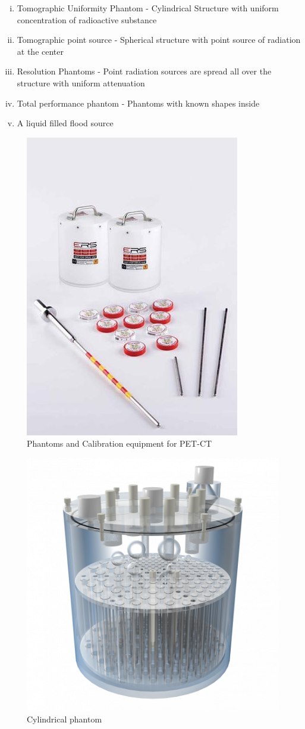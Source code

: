 \documentclass[12pt]{article}
\begin{document}
\begin{enumerate}[i.]
    \item Tomographic Uniformity Phantom - Cylindrical Structure with uniform concentration of radioactive substance
    \item Tomographic point source - Spherical structure with point source of radiation at the center
    \item Resolution Phantoms - Point radiation sources are spread all over the structure with uniform attenuation
    \item Total performance phantom - Phantoms with known shapes inside 
    \item A liquid filled flood source
    
\end{enumerate}

\begin{figure}[h!]
    \centering
    \includegraphics[width=0.45\linewidth]{phantom.jpg}
    \caption{\small{Phantoms and Calibration equipment for PET-CT}}
    \label{fig:Phantoms and Calibration equipment for PET-CT}
\end{figure}
\pagebreak
\begin{figure}[h!]
    \centering
    \includegraphics[width=0.55\linewidth]{phantom1.png}
    \caption{\small{Cylindrical phantom}}
    \label{fig:Cylindrical phantom}
\end{figure}
\end{document}
